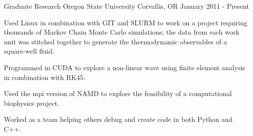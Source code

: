 

\vspace{-3mm}



\begin{cventries}
\vspace{-2mm}


\vspace{-1.5mm}
\cventry
{Graduate Research} %
{Oregon State University} %
{Corvallis, OR} %
{January 2011 - Present} %
{ %
\begin{cvitems}
\item {Used Linux in combination with GIT and SLURM to work on a project requiring thousands of Markov Chain Monte Carlo simulations; the data from each work unit was stitched together to generate the thermodynamic observables of a square-well fluid.}
\item {Programmed in CUDA to explore a non-linear wave using finite element analysis in combination with RK45.}
\item {Used the mpi version of NAMD to explore the feasibility of a computational biophysics project.}
\item{Worked as a team helping others debug and create code in both Python and C++.}
\end{cvitems}
}




\end{cventries}
